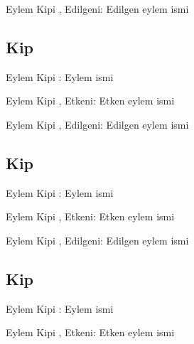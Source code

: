 \begin{eylemkipi}{Eylem Kipi , Edilgeni: }
  Edilgen eylem ismi
\end{eylemkipi}


\subsection*{Kip }

\begin{eylemkipi}{Eylem Kipi : }
  Eylem ismi
\end{eylemkipi}

\begin{eylemkipi}{Eylem Kipi , Etkeni: }
  Etken eylem ismi
\end{eylemkipi}

\begin{eylemkipi}{Eylem Kipi , Edilgeni: }
  Edilgen eylem ismi
\end{eylemkipi}

\subsection*{Kip }

\begin{eylemkipi}{Eylem Kipi : }
  Eylem ismi
\end{eylemkipi}

\begin{eylemkipi}{Eylem Kipi , Etkeni: }
  Etken eylem ismi
\end{eylemkipi}

\begin{eylemkipi}{Eylem Kipi , Edilgeni: }
  Edilgen eylem ismi
\end{eylemkipi}


\subsection*{Kip }

\begin{eylemkipi}{Eylem Kipi : }
  Eylem ismi
\end{eylemkipi}

\begin{eylemkipi}{Eylem Kipi , Etkeni: }
  Etken eylem ismi
\end{eylemkipi}


